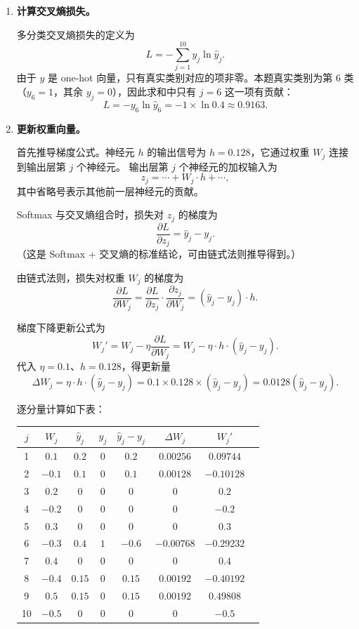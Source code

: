\documentclass[a4, 10pt, comentarios]{aleph-notas}
\begin{document}
\begin{enumerate}[label=（\arabic*）]
    \item \textbf{计算交叉熵损失。}

    多分类交叉熵损失的定义为
    \[
        L=-\sum_{j=1}^{10}y_j\ln\hat y_j.
    \]
    由于 $y$ 是 one-hot 向量，只有真实类别对应的项非零。本题真实类别为第 6 类
    （$y_6=1$，其余 $y_j=0$），因此求和中只有 $j=6$ 这一项有贡献：
    \[
        L=-y_6\ln\hat y_6=-1\times\ln 0.4\approx0.9163.
    \]

    \item \textbf{更新权重向量。}

    首先推导梯度公式。神经元 $h$ 的输出信号为 $h=0.128$，它通过权重 $W_j$ 连接到输出层第 $j$ 个神经元。
    输出层第 $j$ 个神经元的加权输入为
    \[
        z_j=\cdots+W_j\cdot h+\cdots,
    \]
    其中省略号表示其他前一层神经元的贡献。

    Softmax 与交叉熵组合时，损失对 $z_j$ 的梯度为
    \[
        \frac{\partial L}{\partial z_j}=\hat y_j-y_j.
    \]
    （这是 Softmax + 交叉熵的标准结论，可由链式法则推导得到。）

    由链式法则，损失对权重 $W_j$ 的梯度为
    \[
        \frac{\partial L}{\partial W_j}
        =\frac{\partial L}{\partial z_j}\cdot\frac{\partial z_j}{\partial W_j}
        =(\hat y_j-y_j)\cdot h.
    \]

    梯度下降更新公式为
    \[
        W_j'=W_j-\eta\frac{\partial L}{\partial W_j}
        =W_j-\eta\cdot h\cdot(\hat y_j-y_j).
    \]
    代入 $\eta=0.1$、$h=0.128$，得更新量
    \[
        \Delta W_j=\eta\cdot h\cdot(\hat y_j-y_j)=0.1\times0.128\times(\hat y_j-y_j)=0.0128(\hat y_j-y_j).
    \]

    逐分量计算如下表：

    \begin{center}
    \begin{tabular}{cccccccc}
    \toprule
    $j$ & $W_j$ & $\hat y_j$ & $y_j$ & $\hat y_j-y_j$ & $\Delta W_j$ & $W_j'$\\
    \midrule
    1 & $0.1$   & $0.2$  & $0$ & $0.2$  & $0.00256$  & $0.09744$\\
    2 & $-0.1$  & $0.1$  & $0$ & $0.1$  & $0.00128$  & $-0.10128$\\
    3 & $0.2$   & $0$    & $0$ & $0$    & $0$        & $0.2$\\
    4 & $-0.2$  & $0$    & $0$ & $0$    & $0$        & $-0.2$\\
    5 & $0.3$   & $0$    & $0$ & $0$    & $0$        & $0.3$\\
    6 & $-0.3$  & $0.4$  & $1$ & $-0.6$ & $-0.00768$ & $-0.29232$\\
    7 & $0.4$   & $0$    & $0$ & $0$    & $0$        & $0.4$\\
    8 & $-0.4$  & $0.15$ & $0$ & $0.15$ & $0.00192$  & $-0.40192$\\
    9 & $0.5$   & $0.15$ & $0$ & $0.15$ & $0.00192$  & $0.49808$\\
    10 & $-0.5$ & $0$    & $0$ & $0$    & $0$        & $-0.5$\\
    \bottomrule
    \end{tabular}
    \end{center}


\end{enumerate}
\end{document}
